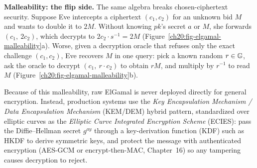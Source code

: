\begin{attackbox}
\textbf{Malleability: the flip side.} The same algebra breaks chosen-ciphertext security. Suppose
Eve intercepts a ciphertext $(c_1, c_2)$ for an unknown bid $M$ and wants to double it to $2M$. Without knowing $pk$'s secret $a$ or $M$, she forwards $(c_1,\ 2 c_2)$, which decrypts to
$2 c_2 \cdot s^{-1} = 2M$ (Figure~\ref{ch20:fig-elgamal-malleability}a). Worse, given a decryption oracle that refuses only the exact challenge $(c_1, c_2)$, Eve recovers $M$ in one query: pick a known random $r \in \mathbb{G}$, ask the oracle to decrypt $(c_1,\ r\cdot c_2)$ to obtain $r M$, and multiply by $r^{-1}$ to read $M$ (Figure~\ref{ch20:fig-elgamal-malleability}b).

Because of this malleability, raw ElGamal is never deployed directly for general encryption. Instead, production systems use the \emph{Key Encapsulation Mechanism / Data Encapsulation Mechanism} (KEM/DEM) hybrid pattern, standardized over elliptic curves as the \emph{Elliptic Curve Integrated Encryption Scheme} (ECIES): pass the Diffie--Hellman secret $g^{ay}$ through a key-derivation function (KDF) such as HKDF to derive symmetric keys, and protect the message with authenticated encryption (AES-GCM or encrypt-then-MAC, Chapter~16) so any tampering causes decryption to reject.
\end{attackbox}

